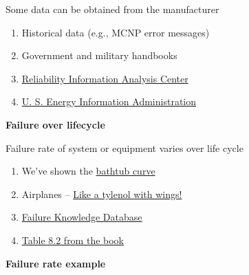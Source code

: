 \documentclass[aspectratio=1610,pdftex,dvipsnames,compress,xcolor={dvipsnames}]{beamer}
\begin{document}
\begin{frame}{Some data can be obtained from the manufacturer}
    \begin{enumerate}[series=outerlist,topsep=0pt,itemsep=21pt,leftmargin=*,label=(\arabic*)]
        \item[]Historical data (e.g., MCNP error messages)
        \item[]Government and military handbooks
        \item[]\href{https://www.quanterion.com/projects/reliability-information-analysis-center-riac/}{Reliability Information Analysis Center}
        \item[]\href{https://www.eia.gov/}{U. S. Energy Information Administration}
    \end{enumerate}
\end{frame}


\begin{frame}[plain]{}
    \centering\LARGE\textbf{Failure over lifecycle}
\end{frame}


\addtocounter{framenumber}{-1}
\begin{frame}{Failure rate of system or equipment varies over life cycle}
    \begin{enumerate}[series=outerlist,topsep=0pt,itemsep=21pt,leftmargin=*,label=(\arabic*)]
        \item[]We've shown the \href{https://qph.cf2.quoracdn.net/main-qimg-caa1625521dba35be9b7f9cad262c0e3-pjlq}{bathtub curve}
        \item[]Airplanes -- \href{https://youtu.be/PDtVP6R6C0g?si=vzNbIzAG3nHTZpRn}{Like a tylenol with wings!}
        \item[]\href{http://www.sozogaku.com/fkd/en/index.html}{Failure Knowledge Database}
        \item[]\href{https://docs.google.com/spreadsheets/d/11KeppAs0_VcJ_vLqMwpkflKbmLzNUPx13o_W31yFI8w/edit?usp=sharing}{Table 8.2 from the book}
    \end{enumerate}
\end{frame}


\begin{frame}[plain]{}
    \centering\LARGE\textbf{Failure rate example}
\end{frame}
\end{document}
